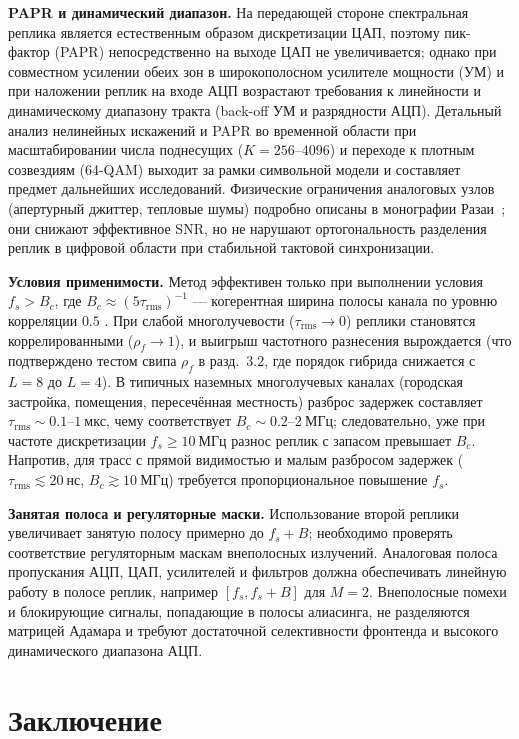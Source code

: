 \documentclass[a4paper,12pt]{article}
\numberwithin{equation}{section}
\begin{document}
\textbf{PAPR и динамический диапазон.} На передающей стороне спектральная реплика является естественным образом дискретизации ЦАП, поэтому пик-фактор (PAPR) непосредственно на выходе ЦАП не увеличивается; однако при совместном усилении обеих зон в широкополосном усилителе мощности (УМ) и при наложении реплик на входе АЦП возрастают требования к линейности и динамическому диапазону тракта (back-off УМ и разрядности АЦП). Детальный анализ нелинейных искажений и PAPR во временной области при масштабировании числа поднесущих ($K = 256\text{--}4096$) и переходе к плотным созвездиям (64-QAM) выходит за рамки символьной модели и составляет предмет дальнейших исследований. Физические ограничения аналоговых узлов (апертурный джиттер, тепловые шумы) подробно описаны в монографии Разаи~\cite{razavi}; они снижают эффективное SNR, но не нарушают ортогональность разделения реплик в цифровой области при стабильной тактовой синхронизации.

\textbf{Условия применимости.} Метод эффективен только при выполнении условия $f_s > B_c$, где $B_c \approx (5\tau_{\text{rms}})^{-1}$ --- когерентная ширина полосы канала по уровню корреляции $0.5$ \cite{goldsmith}. При слабой многолучевости ($\tau_{\text{rms}} \to 0$) реплики становятся коррелированными ($\rho_f \to 1$), и выигрыш частотного разнесения вырождается (что подтверждено тестом свипа $\rho_f$ в разд.~3.2, где порядок гибрида снижается с $L=8$ до $L=4$). В типичных наземных многолучевых каналах (городская застройка, помещения, пересечённая местность) разброс задержек составляет $\tau_{\text{rms}} \sim 0.1\text{--}1~\text{мкс}$, чему соответствует $B_c \sim 0.2\text{--}2~\text{МГц}$; следовательно, уже при частоте дискретизации $f_s \ge 10~\text{МГц}$ разнос реплик с запасом превышает $B_c$. Напротив, для трасс с прямой видимостью и малым разбросом задержек ($\tau_{\text{rms}} \lesssim 20~\text{нс}$, $B_c \gtrsim 10~\text{МГц}$) требуется пропорциональное повышение $f_s$.

\textbf{Занятая полоса и регуляторные маски.} Использование второй реплики увеличивает занятую полосу примерно до $f_s+B$; необходимо проверять соответствие регуляторным маскам внеполосных излучений. Аналоговая полоса пропускания АЦП, ЦАП, усилителей и фильтров должна обеспечивать линейную работу в полосе реплик, например $[f_s, f_s+B]$ для $M=2$. Внеполосные помехи и блокирующие сигналы, попадающие в полосы алиасинга, не разделяются матрицей Адамара и требуют достаточной селективности фронтенда и высокого динамического диапазона АЦП.

\section{Заключение}
\end{document}

